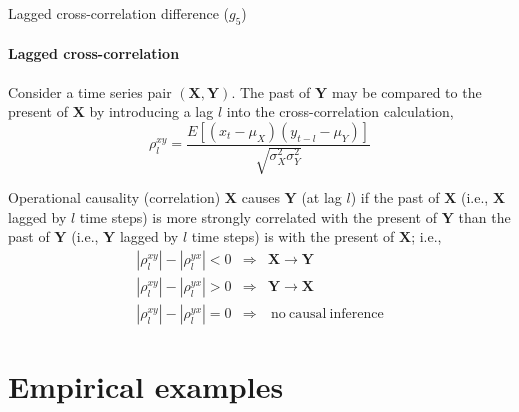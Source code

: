 \documentclass{beamer}
\begin{document}
\begin{frame}{Lagged cross-correlation difference ($g_5$)}
\framesubtitle{Lagged cross-correlation}
Consider a time series pair $(\mathbf{X},\mathbf{Y})$.  The past of $\mathbf{Y}$ may be compared to the present of $\mathbf{X}$ by introducing a lag $l$ into the cross-correlation calculation, 
\begin{equation*}
\rho^{xy}_l = \frac{E\left[\left(x_t-\mu_X\right)\left(y_{t-l}-\mu_Y\right)\right]}{\sqrt{\sigma^2_X\sigma^2_Y}}
\end{equation*}
\pause
\begin{block}{Operational causality (correlation)}
$\mathbf{X}$ causes $\mathbf{Y}$ (at lag $l$) if the past of $\mathbf{X}$ (i.e., $\mathbf{X}$ lagged by $l$ time steps) is more strongly correlated with the present of $\mathbf{Y}$ than the past of $\mathbf{Y}$ (i.e., $\mathbf{Y}$ lagged by $l$ time steps) is with the present of $\mathbf{X}$; i.e.,
\begin{eqnarray*}
|\rho^{xy}_l| - |\rho^{yx}_l|<0&\Rightarrow& \mathbf{X}\rightarrow\mathbf{Y}\\
|\rho^{xy}_l| - |\rho^{yx}_l|>0&\Rightarrow& \mathbf{Y}\rightarrow\mathbf{X}\\
|\rho^{xy}_l| - |\rho^{yx}_l|=0&\Rightarrow& \mathrm{\ no\ causal\ inference}
\end{eqnarray*}
\end{block}
\end{frame}

\section{Empirical examples}
\end{document}
